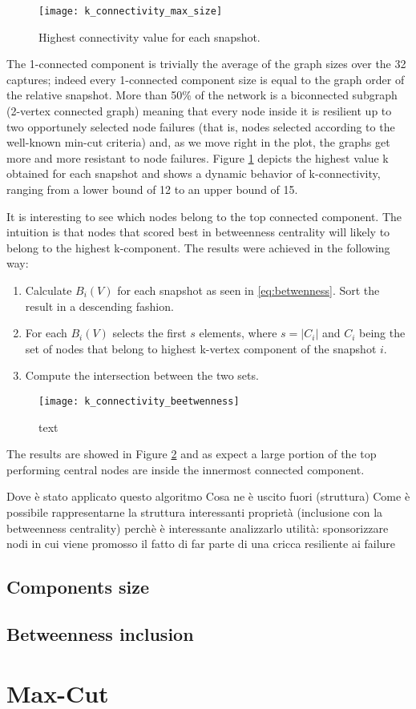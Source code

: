 	\begin{figure}
		\texttt{[image: k\_connectivity\_max\_size]}
		\caption{Highest connectivity value for each snapshot.}
		\label{monthly_connectivity_max_size}
	\end{figure}
	
	The 1-connected component is trivially the average of the graph sizes over the 32 captures; indeed every 1-connected component size is equal to the graph order of the relative snapshot. More than 50\% of the network is a biconnected subgraph (2-vertex connected graph) meaning that every node inside it is resilient up to two opportunely selected node failures (that is, nodes selected according to the well-known min-cut criteria) and, as we move right in the plot, the graphs get more and more resistant to node failures. Figure \ref{monthly_connectivity_max_size} depicts the highest value k obtained for each snapshot and shows a dynamic behavior of k-connectivity, ranging from a lower bound of 12 to an upper bound of 15.
	
	It is interesting to see which nodes belong to the top connected component. The intuition is that nodes that scored best in betweenness centrality will likely to belong to the highest k-component. The results were achieved in the following way:
	\begin{enumerate}
		\item Calculate $B_i(V)$ for each snapshot as seen in \ref{eq:betwenness}. Sort the result in a descending fashion. 
		\item For each $B_i(V)$ selects the first $s$ elements, where $s = |C_i|$ and $C_i$ being the set of nodes that belong to highest k-vertex component of the snapshot $i$.
		\item Compute the intersection between the two sets.
	\end{enumerate}
	
	\begin{figure}
		\texttt{[image: k\_connectivity\_beetwenness]}
		\caption{text}
		\label{monthyl_k_connectivity_betweenness}
	\end{figure}
	
	The results are showed in Figure \ref{monthyl_k_connectivity_betweenness} and as expect a large portion of the top performing central nodes are inside the innermost connected component.
	
	Dove è stato applicato questo algoritmo
	Cosa ne è uscito fuori (struttura)
	Come è possibile rappresentarne la struttura
	interessanti proprietà (inclusione con la betweenness centrality)
	perchè è interessante analizzarlo
	utilità: sponsorizzare nodi in cui viene promosso il fatto di far parte di una cricca resiliente ai failure
		
	\subsection{Components size}
	\subsection{Betweenness inclusion}
	\section{Max-Cut}
